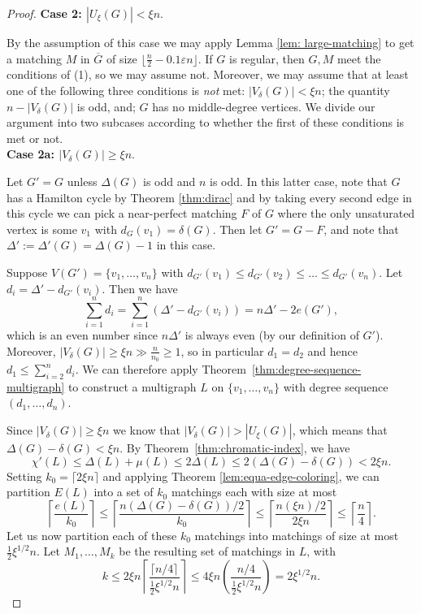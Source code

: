 \documentclass[11pt, oneside]{article}
\newcommand{\ve}{\varepsilon}
\begin{document}
\begin{proof}
\noindent \textbf{Case 2: $|U_\xi(G)| < \xi n$}. 

By the assumption of this case we may apply Lemma \ref{lem: large-matching} to get a matching $M$ in $\overline{G}$ of size  $\lfloor \frac{n}{2} - 0.1 \ve n \rfloor$. If $G$ is regular, then $G, M$ meet the conditions of (1), so we may assume not. Moreover, we may assume that at least one of the following three conditions is \emph{not} met: $|V_\delta(G)|<\xi n$; the quantity $n-|V_\delta(G)|$ is odd, and; $G$ has no middle-degree vertices. We divide our argument into two subcases according to whether the first of these conditions is met or not.\\

\noindent \textbf{Case 2a: $|V_\delta(G)| \geq \xi n$}. 

Let $G'=G$ unless $\Delta(G)$ is odd and $n$ is odd. In this latter case, note that $G$ has a Hamilton cycle by Theorem \ref{thm:dirac} and by taking every second edge in this cycle we can pick a near-perfect matching $F$ of $G$ where the only unsaturated vertex is some $v_1$ with $d_G(v_1)=\delta(G)$. Then let $G'=G-F$, and note that $\Delta':=\Delta'(G)=\Delta(G)-1$ in this case.

Suppose $V(G')=\{v_1, \ldots, v_n\}$ with $d_{G'}(v_1) \le d_{G'}(v_2) \le \ldots \le d_{G'}(v_n)$. Let $d_i=\Delta'-d_{G'}(v_i)$. 
Then we have 
$$\sum_{i=1}^n d_i = \sum_{i=1}^n (\Delta'-d_{G'}(v_i))=n\Delta'-2e(G'),$$
which is an even number since $n\Delta'$ is always even (by our definition of $G'$). Moreover, $|V_\delta(G)| \ge \xi n\gg \tfrac{n}{n_0}\geq 1$, so in particular $d_1=d_2$ and hence $d_1\leq \sum_{i=2}^n d_i$. We can therefore apply Theorem~\ref{thm:degree-sequence-multigraph} to construct a multigraph  $L$ on $\{v_1, \ldots, v_n\}$
with degree sequence $(d_1, \ldots, d_n)$.  

Since $|V_\delta(G)| \geq \xi n$ we know that $|V_\delta(G)|> |U_{\xi}(G)|$, which means that $\Delta(G)-\delta(G) < \xi n$. By Theorem~\ref{thm:chromatic-index}, we have 
 $$\chi'(L)\leq \Delta(L)+\mu(L)\leq 2\Delta(L)\leq 2(\Delta(G)-\delta(G))< 2\xi n.$$
 Setting $k_0= \lceil 2\xi n \rceil$ and applying Theorem \ref{lem:equa-edge-coloring}, we can partition $E(L)$ into a set of $k_0$ matchings each with size at most $$\left\lceil\frac{e(L)}{k_0}\right\rceil\leq \left\lceil\frac{n (\Delta(G)-\delta(G))/2}{k_0}\right\rceil \leq \left\lceil\frac{n(\xi n)/2}{2\xi n}\right\rceil \leq  \left\lceil\frac{n}{4}\right\rceil.$$ 
Let us now partition each of these $k_0$ matchings into matchings of size at most $\tfrac{1}{2}\xi^{1/2}n$. Let $M_1, \ldots, M_k$ be the resulting set of matchings in $L$, with 
$$k\leq  2\xi n \left\lceil \frac{\lceil n/4\rceil}{ \tfrac{1}{2}\xi^{1/2}n} \right\rceil \leq 4\xi n \left( \frac{ n/4}{ \tfrac{1}{2}\xi^{1/2}n} \right) = 2\xi^{1/2} n. $$


\end{proof}
\end{document}
